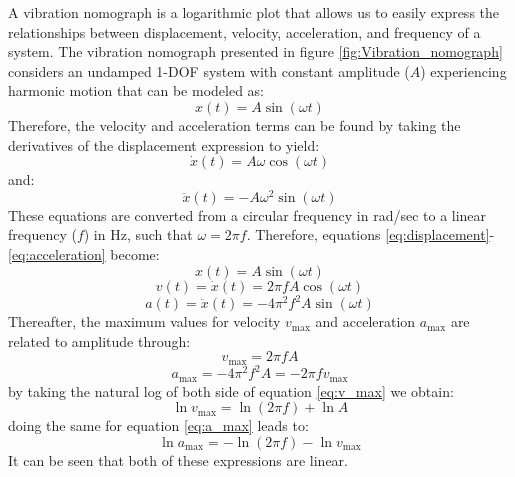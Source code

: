 \documentclass[12pt,letter]{article}
\numberwithin{ex}{section} %
\numberwithin{re}{section} %
\begin{document}
A vibration nomograph is a logarithmic plot that allows us to easily express the relationships between displacement, velocity, acceleration, and frequency of a system. The vibration nomograph presented in figure \ref{fig:Vibration_nomograph} considers an undamped 1-DOF system with constant amplitude ($A$) experiencing harmonic motion that can be modeled as:
\begin{equation}
    x(t) = A \sin(\omega t)
    \label{eq:displacement}
\end{equation}
Therefore, the velocity and acceleration terms can be found by taking the derivatives of the displacement expression to yield:
\begin{equation}
    \dot{x}(t) = A \omega \cos(\omega t)
\end{equation}
and:
\begin{equation}
    \ddot{x}(t) = -A\omega^2 \sin(\omega t)
    \label{eq:acceleration}
\end{equation}
These equations are converted from a circular frequency in rad/sec to a linear frequency ($f$) in Hz, such that $\omega = 2\pi f$. Therefore, equations \ref{eq:displacement}-\ref{eq:acceleration} become:
\begin{equation}
    x(t) = A \sin(\omega t)
\end{equation}
\begin{equation}
    v(t) =  \dot{x}(t) = 2\pi f A \cos(\omega t)
\end{equation}
\begin{equation}
    a(t) =  \ddot{x}(t) = -4\pi^2 f^2 A \sin(\omega t)
\end{equation}
Thereafter, the maximum values for velocity $v_\text{max}$ and acceleration $a_\text{max}$ are related to amplitude through:
\begin{equation}
    v_\text{max} = 2\pi f A 
    \label{eq:v_max}
\end{equation}
\begin{equation}
    a_\text{max} = -4\pi^2 f^2 A = -2 \pi f v_\text{max}
    \label{eq:a_max}
\end{equation}
by taking the natural log of both side of equation \ref{eq:v_max} we obtain: 
\begin{equation}
    \ln v_\text{max} = \ln(2\pi f) + \ln A
    \label{eq:ln_v_max} 
\end{equation}
doing the same for equation \ref{eq:a_max} leads to:
\begin{equation}
     \ln a_\text{max} = - \ln(2\pi f) - \ln v_\text{max}
    \label{eq:ln_v_max_2} 
\end{equation}
It can be seen that both of these expressions are linear. 
\end{document}
